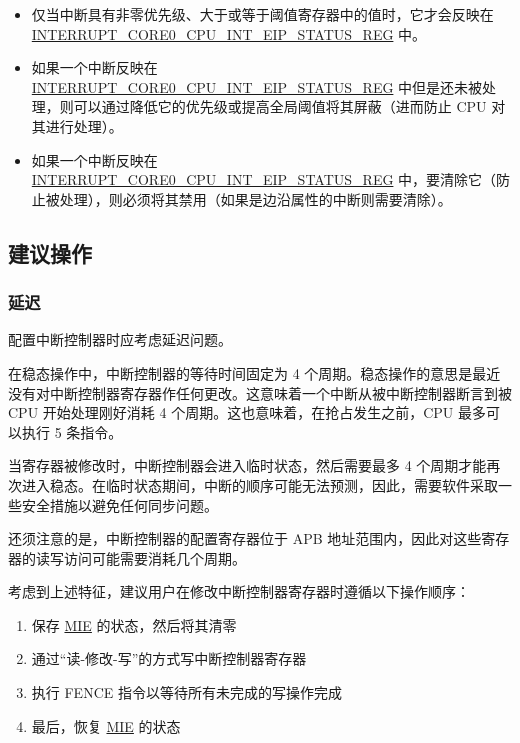 \documentclass[main\_\_CN.tex]{subfiles}
\begin{document}
\begin{itemize}
    \item 仅当中断具有非零优先级、大于或等于阈值寄存器中的值时，它才会反映在 \hyperref[regdesc:INTERRUPTCORE0CPUINTEIPSTATUSREG]{INTERRUPT\_CORE0\_CPU\_INT\_EIP\_STATUS\_REG} 中。
    \item 如果一个中断反映在 \hyperref[regdesc:INTERRUPTCORE0CPUINTEIPSTATUSREG]{INTERRUPT\_CORE0\_CPU\_INT\_EIP\_STATUS\_REG} 中但是还未被处理，则可以通过降低它的优先级或提高全局阈值将其屏蔽（进而防止 CPU 对其进行处理）。
    \item 如果一个中断反映在\\ \hyperref[regdesc:INTERRUPTCORE0CPUINTEIPSTATUSREG]{INTERRUPT\_CORE0\_CPU\_INT\_EIP\_STATUS\_REG} 中，要清除它（防止被处理），则必须将其禁用（如果是边沿属性的中断则需要清除）。
\end{itemize}

\subsection{建议操作}
\label{sec:riscvcpu-int-suggest-op}

\subsubsection{延迟}
\label{sec:riscvcpu-int-latency}

配置中断控制器时应考虑延迟问题。

在稳态操作中，中断控制器的等待时间固定为 4 个周期。稳态操作的意思是最近没有对中断控制器寄存器作任何更改。这意味着一个中断从被中断控制器断言到被 CPU 开始处理刚好消耗 4 个周期。这也意味着，在抢占发生之前，CPU 最多可以执行 5 条指令。

当寄存器被修改时，中断控制器会进入临时状态，然后需要最多 4 个周期才能再次进入稳态。在临时状态期间，中断的顺序可能无法预测，因此，需要软件采取一些安全措施以避免任何同步问题。

还须注意的是，中断控制器的配置寄存器位于 APB 地址范围内，因此对这些寄存器的读写访问可能需要消耗几个周期。

考虑到上述特征，建议用户在修改中断控制器寄存器时遵循以下操作顺序：

\begin{enumerate}
    \item 保存 \hyperref[fielddesc:MSTATUSMIE]{MIE} 的状态，然后将其清零
    \item 通过“读-修改-写”的方式写中断控制器寄存器
    \item 执行 FENCE 指令以等待所有未完成的写操作完成
    \item 最后，恢复 \hyperref[fielddesc:MSTATUSMIE]{MIE} 的状态
\end{enumerate}
\end{document}
